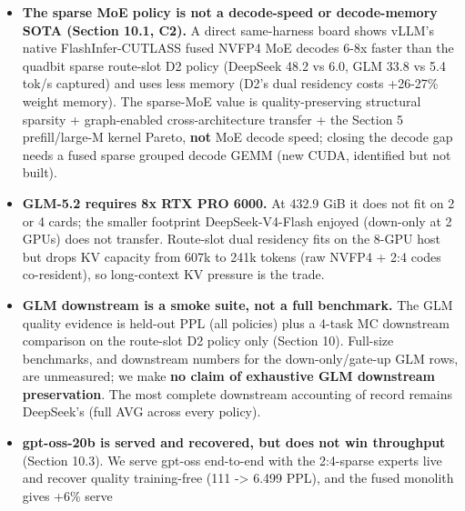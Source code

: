 \documentclass[
]{article}
\begin{document}
\begin{itemize}
  dequant-to-bf16 loop (\textbf{no custom dense grouped-GEMM was
  required}), so the captured DeepSeek-D2 path decodes faster than eager
  (5.82 vs 4.04 tok/s at matched PPL). This is a
  \textbf{same-model/same-policy speed/quality/memory Pareto result}
  against our own dequant-loop and eager paths, \textbf{not a
  production-wide decode-speed win} over other serving stacks. The
  remaining honest caveats are backend-scoped: the native delegate
  depends on FlashInfer availability and its swizzled NVFP4 scale
  layout, and the GLM graph rows are validated on a short held-out
  passage. Not a DSA, attention, memory, or loader blocker.
\item
  \textbf{The sparse MoE policy is not a decode-speed or decode-memory
  SOTA (Section 10.1, C2).} A direct same-harness board shows vLLM's
  native FlashInfer-CUTLASS fused NVFP4 MoE decodes 6-8x faster than the
  quadbit sparse route-slot D2 policy (DeepSeek 48.2 vs 6.0, GLM 33.8 vs
  5.4 tok/s captured) and uses less memory (D2's dual residency costs
  +26-27\% weight memory). The sparse-MoE value is quality-preserving
  structural sparsity + graph-enabled cross-architecture transfer + the
  Section 5 prefill/large-M kernel Pareto, \textbf{not} MoE decode
  speed; closing the decode gap needs a fused sparse grouped decode GEMM
  (new CUDA, identified but not built).
\item
  \textbf{GLM-5.2 requires 8x RTX PRO 6000.} At 432.9 GiB it does not
  fit on 2 or 4 cards; the smaller footprint DeepSeek-V4-Flash enjoyed
  (down-only at 2 GPUs) does not transfer. Route-slot dual residency
  fits on the 8-GPU host but drops KV capacity from 607k to 241k tokens
  (raw NVFP4 + 2:4 codes co-resident), so long-context KV pressure is
  the trade.
\item
  \textbf{GLM downstream is a smoke suite, not a full benchmark.} The
  GLM quality evidence is held-out PPL (all policies) plus a 4-task MC
  downstream comparison on the route-slot D2 policy only (Section 10).
  Full-size benchmarks, and downstream numbers for the down-only/gate-up
  GLM rows, are unmeasured; we make \textbf{no claim of exhaustive GLM
  downstream preservation}. The most complete downstream accounting of
  record remains DeepSeek's (full AVG across every policy).
\item
  \textbf{gpt-oss-20b is served and recovered, but does not win
  throughput} (Section 10.3). We serve gpt-oss end-to-end with the
  2:4-sparse experts live and recover quality training-free (111
  -\textgreater{} 6.499 PPL), and the fused monolith gives +6\% serve

\end{itemize}
\end{document}
